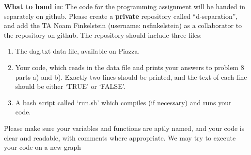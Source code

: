 \documentclass[letterpaper]{article}
\begin{document}
\textbf{What to hand in}: The code for the programming assignment will be handed in separately on
github. Please create a {\bf private} repository called ``d-separation'',
and add the TA Noam Finkelstein (username: nsfinkelstein) as a collaborator to the repository on
github. The repository should include three files:

\begin{enumerate}
  \item The dag.txt data file, available on Piazza.
  \item Your code, which reads in the data file and prints your answers to
problem 8 parts a) and b). Exactly two lines should be printed, and the text
of each line should be either `TRUE' or `FALSE'.
	\item A bash script called `run.sh' which compiles (if necessary) and runs
	  your code.
      \end{enumerate}

      Please make sure your variables and functions are aptly named, and your code
      is clear and readable, with comments where appropriate. We may try to execute your code on a new graph


      
\end{document}
